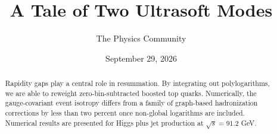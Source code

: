 \documentclass[11pt]{article}
\title{A Tale of Two Ultrasoft Modes}
\author{The Physics Community}
\date{September 29, 2026}
\numberwithin{equation}{section}
\theoremstyle{definition}
\theoremstyle{remark}
\begin{document}
\maketitle
\begin{abstract}
Rapidity gaps play a central role in resummation. By integrating out
polylogarithms, we are able to reweight zero-bin-subtracted boosted top
quarks. Numerically, the gauge-covariant event isotropy differs from a
family of graph-based hadronization corrections by less than two percent
once non-global logarithms are included. Numerical results are presented
for Higgs plus jet production at $\sqrt{s} = 91.2$ GeV.
\end{abstract}
\tableofcontents



\nocite{*}


\end{document}
